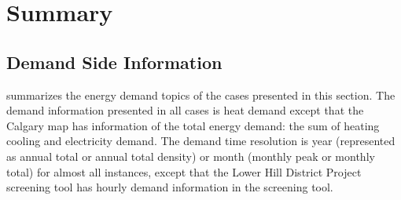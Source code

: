 \section{Summary}\label{summaryMap}
\subsection{Demand Side Information}
 summarizes the energy demand topics of the cases
presented in this section. The demand information presented in all
cases is heat demand except that the Calgary map has information of
the total energy demand: the sum of heating cooling and electricity
demand. The demand time resolution is year (represented as annual
total or annual total density) or month (monthly peak or monthly
total) for almost all instances, except that the Lower Hill District
Project screening tool has hourly demand information in the screening
tool.

